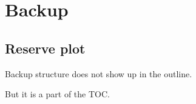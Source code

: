 \section*{Backup}
\subsection*{Reserve plot}
\begin{iframe}
    Backup structure does not show up in the outline.

    But it is a part of the TOC.
\end{iframe}

